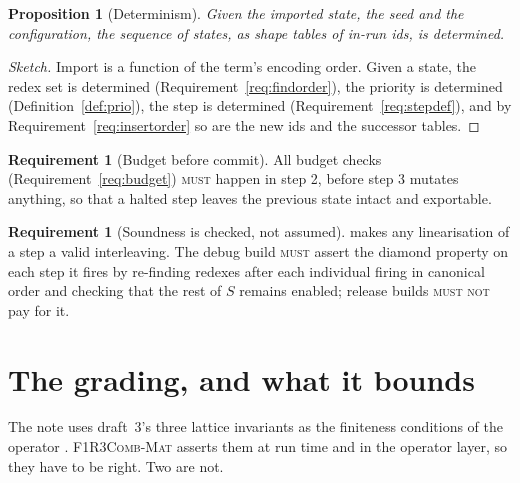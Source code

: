 \documentclass[11pt,a4paper]{article}
\newcommand{\Mat}{\textsc{F1R3Comb-Mat}}
\newcommand{\MUST}{\textsc{must}}
\newcommand{\MUSTNOT}{\textsc{must not}}
\theoremstyle{definition}
\newtheorem{requirement}[definition]{Requirement}
\theoremstyle{plain}
\newtheorem{proposition}[definition]{Proposition}
\begin{document}
\begin{proposition}[Determinism]\label{prop:det}
Given the imported state, the seed and the configuration, the sequence of
states, as shape tables of in-run ids, is determined.
\end{proposition}

\begin{proof}[Sketch]
Import is a function of the term's encoding order. Given a state, the
redex set is determined (Requirement~\ref{req:findorder}), the priority is
determined (Definition~\ref{def:prio}), the step is determined
(Requirement~\ref{req:stepdef}), and by Requirement~\ref{req:insertorder} so
are the new ids and the successor tables.
\end{proof}

\begin{requirement}[Budget before commit]\label{req:budgetcommit}
All budget checks (Requirement~\ref{req:budget}) \MUST{} happen in step 2,
before step 3 mutates anything, so that a halted step leaves the previous
state intact and exportable.
\end{requirement}

\begin{requirement}[Soundness is checked, not assumed]\label{req:soundcheck}
\cite[Thm.~8.3]{matnote} makes any linearisation of a step a valid
interleaving. The debug build \MUST{} assert the diamond property on each
step it fires by re-finding redexes after each individual firing in
canonical order and checking that the rest of $S$ remains enabled; release
builds \MUSTNOT{} pay for it.
\end{requirement}

\section{The grading, and what it bounds}\label{sec:grading}

The note uses draft~3's three lattice invariants as the finiteness conditions
of the operator \cite[Thm.~6.1]{matnote}. \Mat{} asserts them at run time and
in the operator layer, so they have to be right. Two are not.
\end{document}
